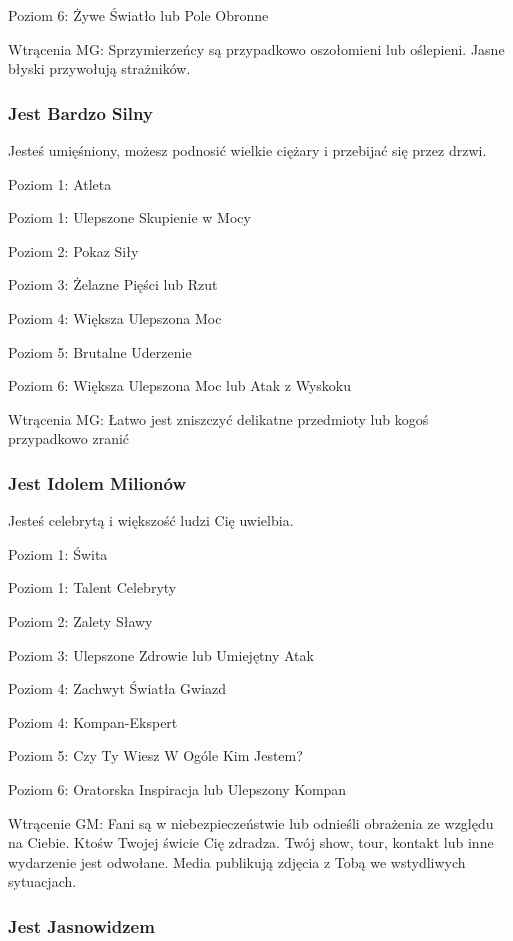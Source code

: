 Poziom 6: Żywe Światło lub Pole Obronne

Wtrącenia MG: Sprzymierzeńcy są przypadkowo oszołomieni lub oślepieni. Jasne błyski przywołują strażników. 

\subsubsection{Jest Bardzo Silny}

Jesteś umięśniony, możesz podnosić wielkie ciężary i przebijać się przez drzwi.

Poziom 1: Atleta

Poziom 1: Ulepszone Skupienie w Mocy

Poziom 2: Pokaz Siły

Poziom 3: Żelazne Pięści lub Rzut

Poziom 4: Większa Ulepszona Moc

Poziom 5: Brutalne Uderzenie

Poziom 6: Większa Ulepszona Moc lub Atak z Wyskoku

Wtrącenia MG: Łatwo jest zniszczyć delikatne przedmioty lub kogoś przypadkowo zranić

\subsubsection{Jest Idolem Milionów}

Jesteś celebrytą i większość ludzi Cię uwielbia.

Poziom 1: Świta

Poziom 1: Talent Celebryty

Poziom 2: Zalety Sławy

Poziom 3: Ulepszone Zdrowie lub Umiejętny Atak

Poziom 4: Zachwyt Światła Gwiazd

Poziom 4: Kompan-Ekspert

Poziom 5: Czy Ty Wiesz W Ogóle Kim Jestem?

Poziom 6: Oratorska Inspiracja lub Ulepszony Kompan

Wtrącenie GM: Fani są w niebezpieczeństwie lub odnieśli obrażenia ze względu na Ciebie. Ktośw Twojej świcie Cię zdradza. Twój show, tour, kontakt lub inne wydarzenie jest odwołane. Media publikują zdjęcia z Tobą we wstydliwych sytuacjach. 

\subsubsection{Jest Jasnowidzem}

